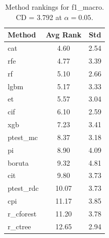 \begin{table}[h]
\centering
\caption{Method rankings for f1_macro. CD = 3.792 at $\alpha=0.05$.}
\label{tab:ranks_f1_macro}
\begin{tabular}{lcc}
\toprule
Method & Avg Rank & Std \\
\midrule
cat & 4.60 & 2.54 \\
rfe & 4.77 & 3.39 \\
rf & 5.10 & 2.66 \\
lgbm & 5.17 & 3.33 \\
et & 5.57 & 3.04 \\
cif & 6.10 & 2.59 \\
xgb & 7.23 & 3.41 \\
ptest_mc & 8.37 & 3.18 \\
pi & 8.90 & 4.09 \\
boruta & 9.32 & 4.81 \\
cit & 9.80 & 3.73 \\
ptest_rdc & 10.07 & 3.73 \\
cpi & 11.17 & 3.85 \\
r_cforest & 11.20 & 3.78 \\
r_ctree & 12.65 & 2.94 \\
\bottomrule
\end{tabular}
\end{table}